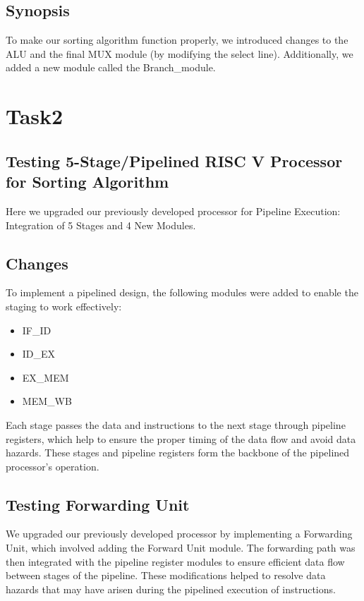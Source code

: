 \documentclass{report}
\begin{document}
\subsection{Synopsis}
    To make our sorting algorithm function properly, we introduced changes to the ALU and the final MUX module (by modifying the select line). Additionally, we added a new module called the Branch\_module.
\newpage
\section{Task2}
\subsection{Testing 5-Stage/Pipelined RISC V Processor for Sorting Algorithm}

Here we upgraded our previously developed processor for Pipeline Execution: Integration of 5 Stages and 4 New Modules.

\subsection{Changes}

To implement a pipelined design, the following modules were added to enable the staging to work effectively:
\begin{itemize}
\item IF\_ID
\item ID\_EX
\item EX\_MEM
\item MEM\_WB
\end{itemize}

Each stage passes the data and instructions to the next stage through pipeline registers, which help to ensure the proper timing of the data flow and avoid data hazards. These stages and pipeline registers form the backbone of the pipelined processor's operation.

\subsection{Testing Forwarding Unit}

We upgraded our previously developed processor by implementing a Forwarding Unit, which involved adding the Forward Unit module. The forwarding path was then integrated with the pipeline register modules to ensure efficient data flow between stages of the pipeline. These modifications helped to resolve data hazards that may have arisen during the pipelined execution of instructions.
\pagebreak
\end{document}
